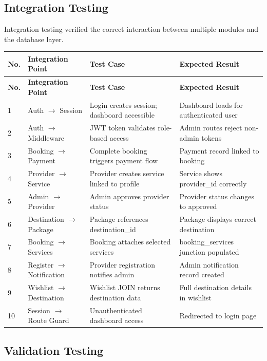 \subsection{Integration Testing}

Integration testing verified the correct interaction between multiple modules and the database layer.

\begin{longtable}{|p{0.5cm}|p{4cm}|p{4.5cm}|p{3.5cm}|}
\hline
\textbf{No.} & \textbf{Integration Point} & \textbf{Test Case} & \textbf{Expected Result} \\
\hline
\endfirsthead
\hline
\textbf{No.} & \textbf{Integration Point} & \textbf{Test Case} & \textbf{Expected Result} \\
\hline
\endhead
1 & Auth $\rightarrow$ Session & Login creates session; dashboard accessible & Dashboard loads for authenticated user \\
\hline
2 & Auth $\rightarrow$ Middleware & JWT token validates role-based access & Admin routes reject non-admin tokens \\
\hline
3 & Booking $\rightarrow$ Payment & Complete booking triggers payment flow & Payment record linked to booking \\
\hline
4 & Provider $\rightarrow$ Service & Provider creates service linked to profile & Service shows provider\_id correctly \\
\hline
5 & Admin $\rightarrow$ Provider & Admin approves provider status & Provider status changes to approved \\
\hline
6 & Destination $\rightarrow$ Package & Package references destination\_id & Package displays correct destination \\
\hline
7 & Booking $\rightarrow$ Services & Booking attaches selected services & booking\_services junction populated \\
\hline
8 & Register $\rightarrow$ Notification & Provider registration notifies admin & Admin notification record created \\
\hline
9 & Wishlist $\rightarrow$ Destination & Wishlist JOIN returns destination data & Full destination details in wishlist \\
\hline
10 & Session $\rightarrow$ Route Guard & Unauthenticated dashboard access & Redirected to login page \\
\hline
\end{longtable}

\subsection{Validation Testing}

